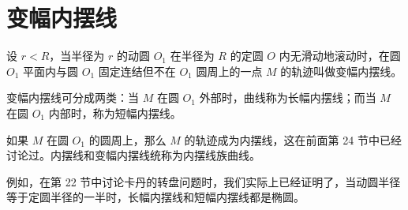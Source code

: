 \section{变幅内摆线}

设 $r<R$，当半径为 $r$ 的动圆 $O_1$ 在半径为 $R$ 的定圆 $O$ 内无滑动地滚动时，在圆 $O_1$ 平面内与圆 $O_1$ 固定连结但不在 $O_1$ 圆周上的一点 $M$ 的轨迹叫做变幅内摆线。

变幅内摆线可分成两类：当 $M$ 在圆 $O_1$ 外部时，曲线称为长幅内摆线；而当 $M$ 在圆 $O_1$ 内部时，称为短幅内摆线。

如果 $M$ 在圆 $O_1$ 的圆周上，那么 $M$ 的轨迹成为内摆线，这在前面第 24 节中已经讨论过。内摆线和变幅内摆线统称为内摆线族曲线。

例如，在第 22 节中讨论卡丹的转盘问题时，我们实际上已经证明了，当动圆半径等于定圆半径的一半时，长幅内摆线和短幅内摆线都是椭圆。

